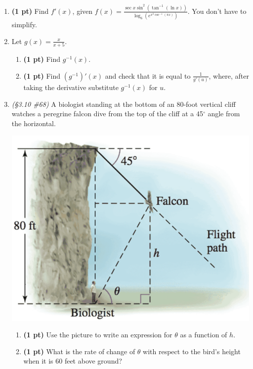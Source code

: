 \documentclass[12pt]{article}
\begin{document}
\begin{enumerate}
\item {\bf (1 pt)} Find $f'(x)$, given $f(x)=\frac{\sec x\sin^2{(\tan^{-1}{(\ln x)})}}{\log_{6}{(e^{x^2\csc^{-1}{(\pi x)}})}}$.  You don't have to simplify.

\item Let $g(x)=\frac{x}{x+5}$.
	\begin{enumerate}
	\item {\bf (1 pt)} Find $g^{-1}(x)$.
	\item {\bf (1 pt)} Find $(g^{-1})'(x)$ and check that it is equal to $\frac{1}{g'(u)}$, where, after taking the derivative substitute $g^{-1}(x)$ for $u$.
	\end{enumerate}

\item \emph{(\S 3.10 \#68)} A biologist standing at the bottom of an 80-foot vertical cliff watches a peregrine falcon dive from the top of the cliff at a 45$^{\circ}$ angle from the horizontal.
\begin{center}
\includegraphics[scale=0.625]{Q6pic1}
\end{center}
\begin{enumerate}
	\item {\bf (1 pt)} Use the picture to write an expression for $\theta$ as a function of $h$.
	\item {\bf (1 pt)} What is the rate of change of $\theta$ with respect to the bird's height when it is 60 feet above ground?
\end{enumerate}


\end{enumerate}
\end{document}
